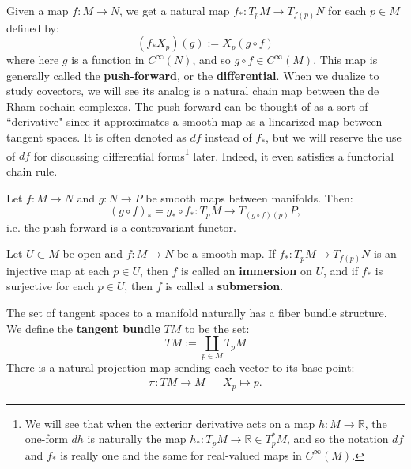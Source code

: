 Given a map $f : M\rightarrow N$, we get a natural map $f_* : T_p M\rightarrow T_{f(p)} N$ for each $p\in M$ defined by:
\begin{equation}
	(f_*X_p)(g) := X_p(g\circ f)
\end{equation}
where here $g$ is a function in $C^\infty(N)$, and so $g\circ f\in C^\infty(M)$. This map is generally called the 
\textbf{push-forward}, or the \textbf{differential}. When we dualize to study covectors, we will see its analog is a natural chain 
map between the de Rham cochain complexes. The push forward can be thought of as a sort of ``derivative" since it 
approximates a smooth map as a linearized map between tangent spaces. It is often denoted as $df$ instead of $f_*$, but 
we will reserve the use of $df$ for discussing differential forms\footnote{We will see that when the exterior derivative acts on a 
map $h : M\rightarrow\mathbb R$, the one-form $dh$ is naturally the map $h_* : T_p M\rightarrow\mathbb R\in T_p^* M$, and 
so the notation $df$ and $f_*$ is really one and the same for real-valued maps in $C^\infty(M)$.} later. Indeed, it even 
satisfies a functorial chain rule.
\begin{theorem}
	Let $f : M\rightarrow N$ and $g : N\rightarrow P$ be smooth maps between manifolds. Then:
	\begin{equation}
		(g\circ f)_* = g_*\circ f_* : T_p M\rightarrow T_{(g\circ f)(p)}P,
	\end{equation}
	i.e. the push-forward is a contravariant functor. 
\end{theorem}
Let $U\subset M$ be open and $f : M\rightarrow N$ be a smooth map. If $f_* : T_p M\rightarrow T_{f(p)}N$ is an injective map at each $p\in U$, then $f$ is called an \textbf{immersion} on $U$, and if $f_*$ is surjective for each $p\in U$, then $f$ is called a \textbf{submersion}. 

The set of tangent spaces to a manifold naturally has a fiber bundle structure. We define the \textbf{tangent bundle} $TM$ to be the set:
\begin{equation}
	TM := \coprod_{p\in M} T_p M
\end{equation}
There is a natural projection map sending each vector to its base point:
\begin{align}
	\pi : TM \rightarrow M &&
		X_p \mapsto p.
\end{align}

